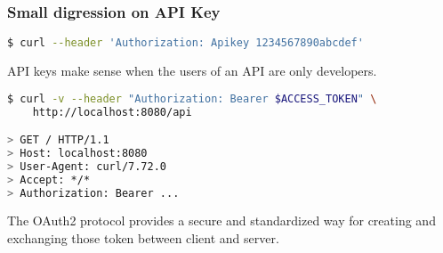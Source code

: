 \subsubsection{Small digression on API Key}
\begin{lstlisting}[language=bash]
$ curl --header 'Authorization: Apikey 1234567890abcdef'
\end{lstlisting}
API keys make sense when the users of an API are only developers.


\begin{lstlisting}[language=bash]
$ curl -v --header "Authorization: Bearer $ACCESS_TOKEN" \
    http://localhost:8080/api

> GET / HTTP/1.1
> Host: localhost:8080
> User-Agent: curl/7.72.0
> Accept: */*
> Authorization: Bearer ...
\end{lstlisting}

The OAuth2 protocol provides a secure and standardized way for creating and exchanging those token between client and server.



